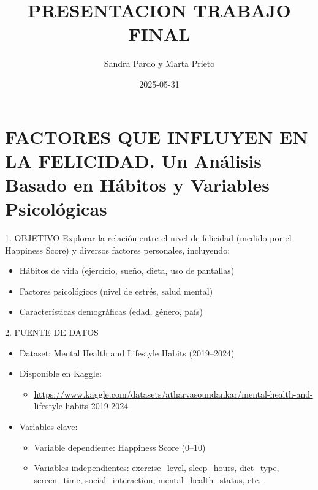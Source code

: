 \documentclass[
  ignorenonframetext,
]{beamer}
\title{PRESENTACION TRABAJO FINAL}
\author{Sandra Pardo y Marta Prieto}
\date{2025-05-31}
\providecommand{\tightlist}{%
  \setlength{\itemsep}{0pt}\setlength{\parskip}{0pt}}
\begin{document}
\frame{\titlepage}

\section{\texorpdfstring{FACTORES QUE INFLUYEN EN LA FELICIDAD.
\textbf{Un Análisis Basado en Hábitos y Variables
Psicológicas}}{FACTORES QUE INFLUYEN EN LA FELICIDAD. Un Análisis Basado en Hábitos y Variables Psicológicas}}\label{factores-que-influyen-en-la-felicidad.-un-anuxe1lisis-basado-en-huxe1bitos-y-variables-psicoluxf3gicas}

\begin{frame}{1. OBJETIVO}
\label{objetivo}
Explorar la relación entre el nivel de felicidad (medido por el
Happiness Score) y diversos factores personales, incluyendo:

\begin{itemize}
\item
  Hábitos de vida (ejercicio, sueño, dieta, uso de pantallas)
\item
  Factores psicológicos (nivel de estrés, salud mental)
\item
  Características demográficas (edad, género, país)
\end{itemize}
\end{frame}

\begin{frame}{2. FUENTE DE DATOS}
\label{fuente-de-datos}
\begin{itemize}
\item
  Dataset: Mental Health and Lifestyle Habits (2019--2024)
\item
  Disponible en Kaggle:

  \begin{itemize}
  \tightlist
  \item
    \url{https://www.kaggle.com/datasets/atharvasoundankar/mental-health-and-lifestyle-habits-2019-2024}
  \end{itemize}
\item
  Variables clave:

  \begin{itemize}
  \item
    Variable dependiente: Happiness Score (0--10)
  \item
    Variables independientes: exercise\_level, sleep\_hours, diet\_type,
    screen\_time, social\_interaction, mental\_health\_status, etc.
  \end{itemize}
\end{itemize}
\end{frame}
\end{document}

